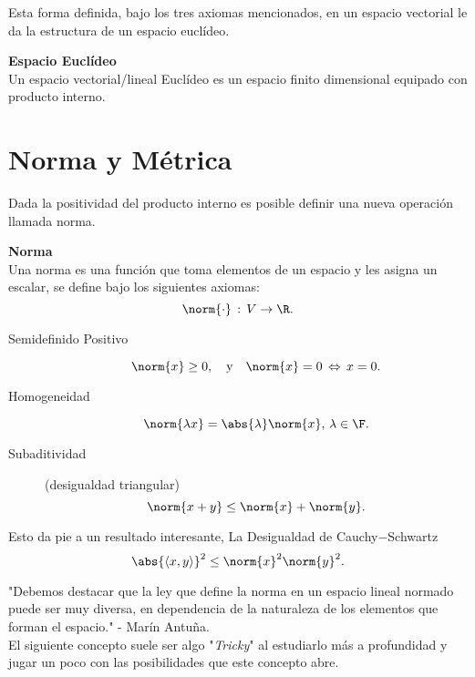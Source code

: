 Esta forma definida, bajo los tres axiomas mencionados, en un espacio vectorial le da la estructura de un espacio euclídeo.


\begin{mdframed}[style=warning]
	{\large \textbf{Espacio Euclídeo}} \\
	Un espacio vectorial/lineal Euclídeo es un espacio finito dimensional equipado con producto interno.
\end{mdframed}

\section*{Norma y Métrica}
Dada la positividad del producto interno es posible definir una nueva operación llamada norma.

\begin{mdframed}[style=warning]
	{\large \textbf{Norma}} \\
	Una norma es una función que toma elementos de un espacio y les asigna un escalar, se define bajo los siguientes axiomas:
	$$ \norm{\cdot} \, : \, V\to \R . $$
	\begin{description}
		\item[Semidefinido Positivo] 
			$$ \norm{x} \geq 0, \quad \text{y} \quad \norm{x} = 0 \, \Leftrightarrow \, x = 0. $$
		\item[Homogeneidad] 
			$$ \norm{\lambda x} = \abs{\lambda} \norm{x}, \, \lambda \in \F . $$
		\item[Subaditividad] (desigualdad triangular)
			$$ \norm{x + y} \leq \norm{x} + \norm{y}. $$
	\end{description}
	Esto da pie a un resultado interesante, La Desigualdad de Cauchy$-$Schwartz
		$$ \abs{\inner{x}{y}} ^2 \leq \norm{x} ^2 \norm{y} ^2. $$
\end{mdframed}

"Debemos destacar que la ley que define la norma en un espacio lineal normado puede ser
muy diversa, en dependencia de la naturaleza de los elementos que forman el espacio." - Marín Antuña. \\

El siguiente concepto suele ser algo "\textit{Tricky}" al estudiarlo más a profundidad y jugar un poco con las posibilidades que este concepto abre.


